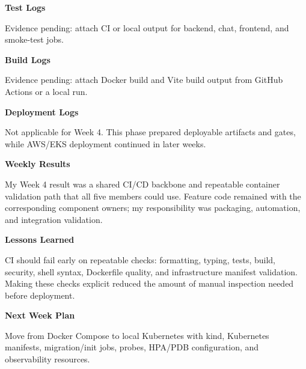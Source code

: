 \vspace{0.5em}\noindent\textbf{Test Logs}\par

Evidence pending: attach CI or local output for backend, chat, frontend,
and smoke-test jobs.

\vspace{0.5em}\noindent\textbf{Build Logs}\par

Evidence pending: attach Docker build and Vite build output from GitHub
Actions or a local run.

\vspace{0.5em}\noindent\textbf{Deployment Logs}\par

Not applicable for Week 4. This phase prepared deployable artifacts and
gates, while AWS/EKS deployment continued in later weeks.

\vspace{0.5em}\noindent\textbf{Weekly Results}\par

My Week 4 result was a shared CI/CD backbone and repeatable container
validation path that all five members could use. Feature code remained
with the corresponding component owners; my responsibility was
packaging, automation, and integration validation.

\vspace{0.5em}\noindent\textbf{Lessons Learned}\par

CI should fail early on repeatable checks: formatting, typing, tests,
build, security, shell syntax, Dockerfile quality, and infrastructure
manifest validation. Making these checks explicit reduced the amount of
manual inspection needed before deployment.

\vspace{0.5em}\noindent\textbf{Next Week Plan}\par

Move from Docker Compose to local Kubernetes with kind, Kubernetes
manifests, migration/init jobs, probes, HPA/PDB configuration, and
observability resources.
